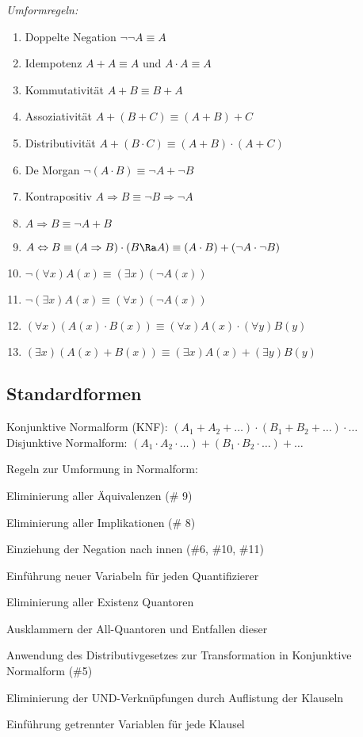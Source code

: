 \documentclass[german,color,6pt]{latex4ei/latex4ei_sheet}
\begin{document}
\begin{emphbox}
\emph{Umformregeln:}
\begin{enumerate}
	\item Doppelte Negation $\neg \neg A \equiv A$
	\item Idempotenz $ A + A \equiv A$ und $ A \cdot A \equiv A$
	\item Kommutativität $A + B \equiv B + A$
	\item Assoziativität $A + (B + C) \equiv (A + B) + C$
	\item Distributivität $A + (B \cdot C) \equiv (A + B) \cdot (A + C)$
	\item De Morgan $\neg(A \cdot B) \equiv \neg A + \neg B$
	\item Kontrapositiv $A \Rightarrow B \equiv \neg B \Rightarrow \neg A$
	\item $ A \Rightarrow B \equiv \neg A + B$
	\item $ A \Leftrightarrow B \equiv (A \Rightarrow B ) \cdot (B \Ra A) \equiv (A \cdot B) + (\neg A \cdot \neg B) $
	\item $ \neg (\forall x)A(x) \equiv (\exists x)(\neg A(x))$
	\item $ \neg (\exists x) A(x) \equiv (\forall x) (\neg{}A(x)) $
	\item $ (\forall x)(A(x) \cdot B(x)) \equiv (\forall x)A(x) \cdot (\forall y )B(y)$
	\item $ (\exists x)(A(x) + B(x)) \equiv (\exists x)A(x) + (\exists y)B(y)$
\end{enumerate}
\end{emphbox}

\begin{sectionbox}
\subsection{Standardformen}
Konjunktive Normalform (KNF): $(A_1 + A_2 + \dots) \cdot (B_1 + B_2 + \dots) \cdot \dots$ \\
Disjunktive Normalform: $(A_1 \cdot A_2 \cdot \dots) + (B_1 \cdot B_2 \cdot \dots) + \dots$
\begin{cookbox}{Regeln zur Umformung in Normalform:}
	\item Eliminierung aller Äquivalenzen (\# 9)
	\item Eliminierung aller Implikationen (\# 8)
	\item Einziehung der Negation nach innen (\#6, \#10, \#11)
	\item Einführung neuer Variabeln für jeden Quantifizierer
	\item Eliminierung aller Existenz Quantoren
	\item Ausklammern der All-Quantoren und Entfallen dieser
	\item Anwendung des Distributivgesetzes zur Transformation in Konjunktive Normalform (\#5)
	\item Eliminierung der UND-Verknüpfungen durch Auflistung der Klauseln
	\item Einführung getrennter Variablen für jede Klausel
\end{cookbox}
\end{sectionbox}
\end{document}
